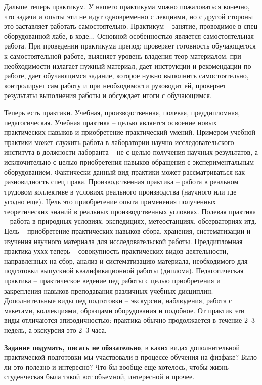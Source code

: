 \documentclass[a4paper, 12pt]{article}
\begin{document}
Дальше теперь практикум. У нашего практикума можно пожаловаться конечно, 
что задачи и опыты эти не идут одновременно с лекциями, но с другой 
стороны это заставляет работать самостоятельно. Практикум -- занятие, 
проводимое в спец оборудованной лабе, в ходе... Основной особенностью 
является самостоятельная работа. При проведении практикума препод: 
проверяет готовность обучающегося к самостоятельной работе, выясняет 
уровень владения теор материалом, при необходимости излагает нужный 
материал, дает инструкции и рекомендации по работе, дает обучающимся 
задание, которое нужно выполнить самостоятельно, контролирует сам работу 
и при необходимости руководит ей, проверяет результаты выполнения работы 
и обсуждает итоги с обучающимся.

Теперь есть практики. Учебная, производственная, полевая, преддипломная, 
педагогическая. Учебная практика -- целью является освоение новых 
практических навыков и приобретение практический умений. Примером 
учебной практики может служить работа в лаборатории 
научно-исследовательского института в должности лаборанта -- не с целью 
получения научных результатов, а исключительно с целью приобретения 
навыков обращения с экспериментальным оборудованием. Фактически данный 
вид практики может рассматриваться как разновидность спец прака. 
Производственная практика -- работа в реальном трудовом коллективе 
в условиях реального производства (научного или где угодно еще). Цель 
это приобретение опыта применения полученных теоретических знаний 
в реальных производственных условиях. Полевая практика -- работа 
в природных условиях, экспедициях, метеостанциях, обсерваториях итд. 
Цель -- приобретение практических навыков сбора, хранения, 
систематизации и изучения научного материала для исследовательской 
работы. Преддипломная практика уххх теперь -- совокупность практических 
видов деятельности, направленных на сбор, анализ и систематизацию 
материала, необходимого для подготовки выпускной квалификационной работы 
(диплома). Педагогическая практика -- практическое ведение пед работы 
с целью приобретения и закрепления навыков преподавания различных 
учебных дисциплин. Дополнительные виды пед подготовки -- экскурсии, 
наблюдения, работа с макетами, коллекциями, образцами оборудования 
и подобное. От практик эти виды отличаются эпизодичностью: практика 
обычно продолжается в течение 2--3 недель, а экскурсия это 2--3 часа.

\textbf{Задание подумать, писать не обязательно}, в каких видах 
дополнительной практической подготовки мы участвовали в процессе 
обучения на физфаке? Было ли это полезно и интересно? Что бы вообще еще 
хотелось, чтобы жизнь студенческая была такой вот объемной, интересной 
и прочее.
\end{document}
